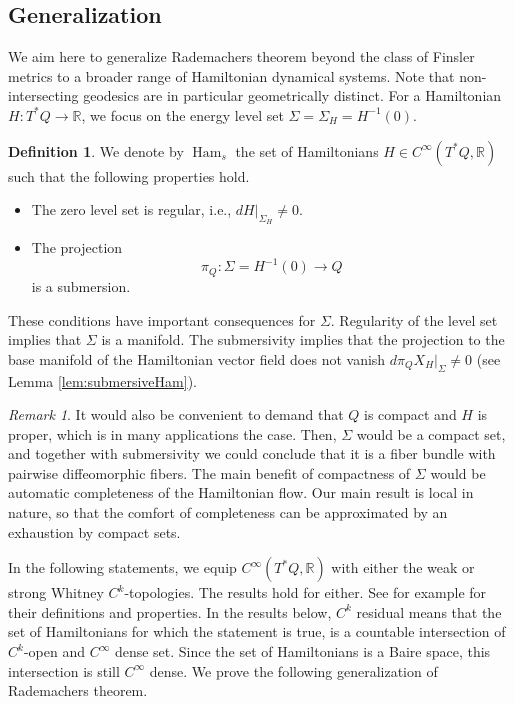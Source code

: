\documentclass{amsart}
\newcommand{\RR}{\mathbb{R}}
\newcommand{\Ham}{\operatorname{Ham}}
\theoremstyle{definition}
\newtheorem{definition}[proposition]{Definition}
\theoremstyle{remark}
\newtheorem{remark}[proposition]{Remark}
\numberwithin{equation}{section}
\begin{document}
\subsection{Generalization}
We aim here to generalize Rademachers theorem beyond the class of Finsler metrics to a broader range of Hamiltonian dynamical systems. Note that non-intersecting geodesics are in particular geometrically distinct. For a Hamiltonian $H:T^*Q\to \RR$, we focus on the energy level set $\Sigma=\Sigma_H= H^{-1}(0)$. 
\begin{definition} 
    We denote by $\Ham_s$ the set of Hamiltonians $H\in C^\infty(T^*Q,\RR)$ such that the following properties hold.
    \begin{itemize}
        \item The zero level set is regular, i.e., $dH|_{\Sigma_H} \neq 0$.
        \item  The projection 
    $$\pi_Q:\Sigma=H^{-1}(0)\to Q$$
    is a submersion.
    \end{itemize}
\end{definition}
These conditions have important consequences for $\Sigma$. Regularity of the level set implies that $\Sigma$ is a manifold. The submersivity implies that the projection to the base manifold of the Hamiltonian vector field does not vanish $d\pi_Q X_H|_\Sigma \neq 0$ (see Lemma \ref{lem:submersiveHam}).
\begin{remark}
    It would also be convenient to demand that $Q$ is compact and $H$ is proper, which is in many applications the case. Then, $\Sigma$ would be a compact set, and together with submersivity we could conclude that it is a fiber bundle with pairwise diffeomorphic fibers. The main benefit of compactness of $\Sigma$ would be automatic completeness of the Hamiltonian flow. Our main result is local in nature, so that the comfort of completeness can be approximated by an exhaustion by compact sets. 
\end{remark}

In the following statements, we equip $C^\infty(T^*Q,\RR)$ with either the weak or strong Whitney $C^k$-topologies. The results hold for either. See for example \cite[Chapter 2]{GG73} for their definitions and properties. In the results below, $C^k$ residual means that the set of Hamiltonians for which the statement is true, is a countable intersection of $C^k$-open and $C^\infty$ dense set. Since the set of Hamiltonians is a Baire space, this intersection is still $C^\infty$ dense. We prove the following generalization of Rademachers theorem. 
\end{document}
